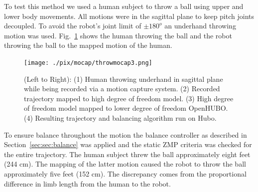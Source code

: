 To test this method we used a human subject to throw a ball using upper and lower body movements.  
All motions were in the sagittal plane to keep pitch joints decoupled.  
To avoid the robot's joint limit of $\pm180^o$ an underhand throwing motion was used.
Fig.~\ref{fig:mocap-underhand} shows the human throwing the ball and the robot throwing the ball to the mapped motion of the human.

\begin{figure}[t]
  \centering
\texttt{[image: ./pix/mocap/throwmocap3.png]}
  \caption{(Left to Right): (1) Human throwing underhand in sagittal plane while being recorded via a motion capture system.  (2) Recorded trajectory mapped to high degree of freedom model.  (3) High degree of freedom model mapped to lower degree of freedom OpenHUBO.  (4) Resulting trajectory and balancing algorithm run on Hubo.}
  \label{fig:mocap-underhand}
\end{figure}

To ensure balance throughout the motion the balance controller as described in Section~\ref{sec:sec:balance} was applied and the static ZMP criteria was checked for the entire trajectory.
The human subject threw the ball approximately eight feet (244 cm).  
The mapping of the latter motion caused the robot to throw the ball approximately five feet (152 cm).
The discrepancy comes from the proportional difference in limb length from the human to the robot.




